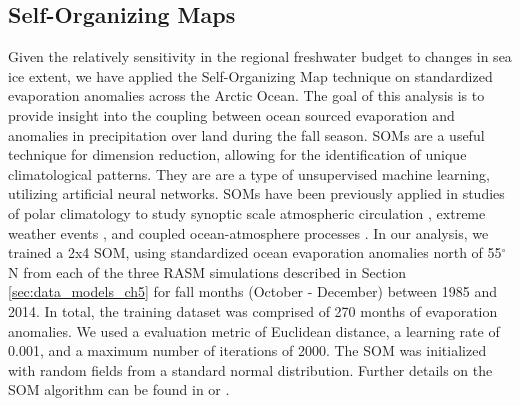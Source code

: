\subsection{Self-Organizing Maps}

\label{sec:soms}
Given the relatively sensitivity in the regional freshwater budget to changes in sea ice extent, we have applied the Self-Organizing Map \citep{Kohonen_1998,Hewitson_2002} technique on standardized evaporation anomalies across the Arctic Ocean. %
The goal of this analysis is to provide insight into the coupling between ocean sourced evaporation and anomalies in precipitation over land during the fall season.
SOMs are a useful technique for dimension reduction, allowing for the identification of unique climatological patterns.
They are are a type of unsupervised machine learning, utilizing artificial neural networks. %
SOMs have been previously applied in studies of polar climatology to study synoptic scale atmospheric circulation \citep[e.g. ][]{Cassano_2007}, extreme weather events \citep[e.g. ][]{Cassano_2015,Glisan_2016}, and coupled ocean-atmosphere processes \citep[e.g. ][]{DuVivier_2016}.
In our analysis, we trained a 2x4 SOM, using standardized ocean evaporation anomalies north of 55$^{\circ}$ N from each of the three RASM simulations described in Section \ref{sec:data_models_ch5} for fall months (October - December) between 1985 and 2014.
In total, the training dataset was comprised of 270 months of evaporation anomalies.
We used a evaluation metric of Euclidean distance, a learning rate of 0.001, and a maximum number of iterations of 2000. %
The SOM was initialized with random fields from a standard normal distribution. %
Further details on the SOM algorithm can be found in \citet{Reusch_2005} or \citet{Cassano_2015}.

